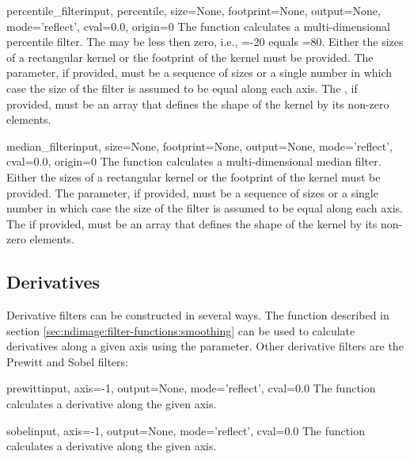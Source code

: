\begin{funcdesc}{percentile_filter}{input, percentile, size=None, 
  footprint=None, output=None, mode='reflect', cval=0.0, origin=0} The
   function calculates a multi-dimensional
  percentile filter.  The  may be less then zero, i.e.,
  =-20 equals =80. Either the sizes of a 
  rectangular kernel or the footprint of the kernel must be provided. The 
   parameter, if provided, must be a sequence of sizes or a 
  single number in which case the size of the filter is assumed to be equal 
  along each axis. The , if provided, must be an array that 
  defines the shape of the kernel by its non-zero elements.
\end{funcdesc}

\begin{funcdesc}{median_filter}{input, size=None, footprint=None, 
  output=None, mode='reflect', cval=0.0, origin=0} The 
   function calculates a multi-dimensional median 
  filter. Either the sizes of a rectangular kernel or the footprint of the 
  kernel must be provided. The  parameter, if provided, must be a 
  sequence of sizes or a single number in which case the size of the filter 
  is assumed to be equal along each axis. The  if provided, 
  must be an array that defines the shape of the kernel by its non-zero 
  elements.
\end{funcdesc}

\subsection{Derivatives}

Derivative filters can be constructed in several ways. The function
 described in section
\ref{sec:ndimage:filter-functions:smoothing} can be used to calculate
derivatives along a given axis using the  parameter. Other
derivative filters are the Prewitt and Sobel filters:

\begin{funcdesc}{prewitt}{input, axis=-1, output=None, mode='reflect', 
  cval=0.0} The  function calculates a derivative along 
  the given axis.
\end{funcdesc}

\begin{funcdesc}{sobel}{input, axis=-1, output=None, mode='reflect', 
  cval=0.0} The  function calculates a derivative along 
  the given axis.
\end{funcdesc}

